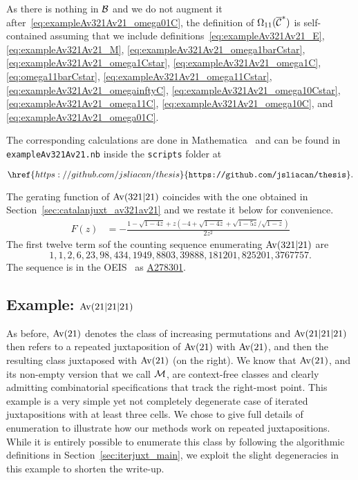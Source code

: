 \documentclass[12pt, a4paper, twoside]{report}
\begin{document}
As there is nothing in $\mathcal{B}$ and we do not augment it after~\eqref{eq:exampleAv321Av21_omega01C}, the definition of $\Omega_{11}(\overline{\mathcal{C}}^*)$ is self-contained assuming that we include definitions~\eqref{eq:exampleAv321Av21_E}, \eqref{eq:exampleAv321Av21_M}, \eqref{eq:exampleAv321Av21_omega1barCstar}, \eqref{eq:exampleAv321Av21_omega1Cstar}, \eqref{eq:exampleAv321Av21_omega1C}, \eqref{eq:omega11barCstar}, \eqref{eq:exampleAv321Av21_omega11Cstar}, \eqref{eq:exampleAv321Av21_omegainftyC}, \eqref{eq:exampleAv321Av21_omega10Cstar}, \eqref{eq:exampleAv321Av21_omega11C}, \eqref{eq:exampleAv321Av21_omega10C}, and \eqref{eq:exampleAv321Av21_omega01C}.

The corresponding calculations are done in Mathematica~\cite{mathematica} and can be found in \texttt{exampleAv321Av21.nb} inside the \texttt{scripts} folder at

$$\href{https://github.com/jsliacan/thesis}{\texttt{https://github.com/jsliacan/thesis}}.$$

The gerating function of $\mathrm{Av}(321|21)$ coincides with the one obtained in Section~\ref{sec:catalanjuxt_av321av21} and we restate it below for convenience.
\begin{align*}
  F(z) &= -\frac{1-\sqrt{1-4z} + z(-4+\sqrt{1-4z} + \sqrt{1-5z}/\sqrt{1-z})}{2z^2}
\end{align*}
The first twelve term sof the counting sequence enumerating $\mathrm{Av}(321|21)$ are
$$1,1,2,6,23,98,434,1949,8803,39888,181201,825201,3767757.$$
The sequence is in the OEIS~\cite{oeis} as \href{https://oeis.org/A278301}{A278301}.
\subsection{Example: $\mathrm{Av}(21|21|21)$}
\label{sec:example_mmm}
As before, $\mathrm{Av}(21)$ denotes the class of increasing permutations and $\mathrm{Av}(21|21|21)$ then refers to a repeated juxtaposition of $\mathrm{Av}(21)$ with $\mathrm{Av}(21)$, and then the resulting class juxtaposed with $\mathrm{Av}(21)$ (on the right). We know that $\mathrm{Av}(21)$, and its non-empty version that we call $\mathcal{M}$, are context-free classes and clearly admitting combinatorial specifications that track the right-most point. This example is a very simple yet not completely degenerate case of iterated juxtapositions with at least three cells. We chose to give full details of enumeration to illustrate how our methods work on repeated juxtapositions. While it is entirely possible to enumerate this class by following the algorithmic definitions in Section~\ref{sec:iterjuxt_main}, we exploit the slight degeneracies in this example to shorten the write-up.
\end{document}
